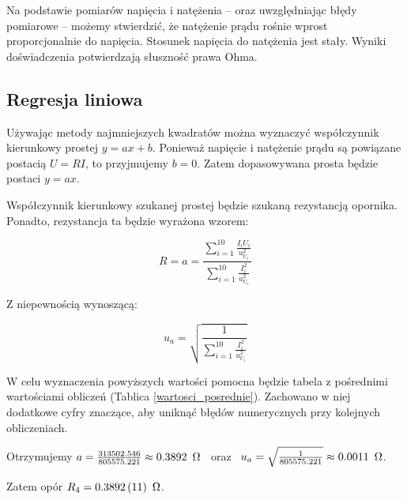 \documentclass[a4paper]{article}
\newlength{\du}
\begin{document}
Na podstawie pomiarów napięcia i natężenia -- oraz uwzględniając błędy pomiarowe -- możemy stwierdzić, że natężenie prądu rośnie wprost proporcjonalnie do napięcia.
Stosunek napięcia do natężenia jest stały.
Wyniki doświadczenia potwierdzają słuszność prawa Ohma.

\subsection{Regresja liniowa}

Używając metody najmniejszych kwadratów można wyznaczyć współczynnik kierunkowy prostej $y = ax + b$.
Ponieważ napięcie i natężenie prądu są powiązane postacią $U = RI$, to przyjmujemy $b = 0$.
Zatem dopasowywana prosta będzie postaci $y = ax$.

Współczynnik kierunkowy szukanej prostej będzie szukaną rezystancją opornika. Ponadto, rezystancja ta będzie wyrażona wzorem:

$$R = a = \frac{\sum_{i = 1}^{10}\frac{I_i U_i}{u_{U_i}^2}}{\sum_{i = 1}^{10}\frac{I_i^2}{u_{U_i}^2}}$$

Z niepewnością wynoszącą:

$$u_a = \sqrt{\frac{1}{\sum_{i = 1}^{10}\frac{I_i^2}{u_{U_i}^2}}}$$

W celu wyznaczenia powyższych wartości pomocna będzie tabela z pośrednimi wartościami obliczeń (Tablica \ref{wartosci_posrednie}). Zachowano w niej dodatkowe cyfry znaczące, aby uniknąć błędów numerycznych przy kolejnych obliczeniach.


Otrzymujemy $a = \frac{313502.546}{805575.221} \approx 0.3892 \enskip \Omega \enskip $ oraz $\enskip u_a = \sqrt{\frac{1}{805575.221}} \approx 0.0011 \enskip \Omega$.

Zatem opór $R_4 = 0.3892 \, (11) \enskip \Omega$.
\vspace{2em}
\end{document}
